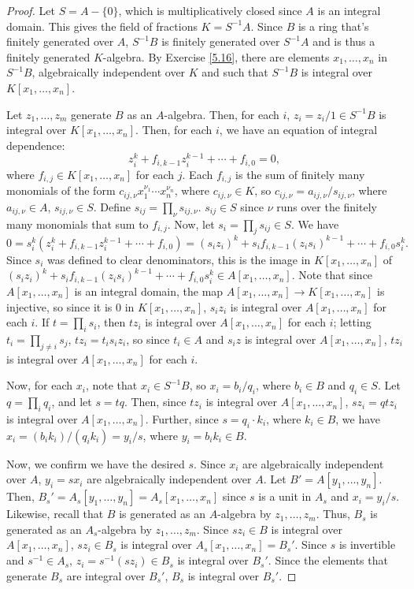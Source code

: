 \begin{proof}
Let $S = A - \{0\}$, which is multiplicatively closed since $A$ is an integral domain. This gives the field of fractions $K = S^{-1}A$. Since $B$ is a ring
that's finitely generated over $A$, $S^{-1}B$ is finitely generated over $S^{-1}A$ and is thus a finitely generated $K$-algebra. By Exercise \ref{5.16},
there are elements $x_1,\ldots,x_n$ in $S^{-1}B$, algebraically independent over $K$ and such that $S^{-1}B$ is integral over $K[x_1, \ldots, x_n]$.

Let $z_1,\ldots,z_m$ generate $B$ as an $A$-algebra. Then, for each $i$, $z_i = z_i/1 \in S^{-1}B$ is integral over $K[x_1,\ldots,x_n]$. Then, for each $i$,
we have an equation of integral dependence: 
$$z_i^k + f_{i,k-1} z_i^{k-1} + \cdots + f_{i,0} = 0,$$
where $f_{i,j} \in K[x_1,\ldots,x_n]$ for each $j$. Each $f_{i,j}$ is the sum of finitely many monomials of the form $c_{ij,\nu}x_1^{\nu_1}\cdots x_n^{\nu_n}$, 
where $c_{ij,\nu} \in K$, so $c_{ij,\nu} = a_{ij,\nu}/s_{ij,\nu}$, where $a_{ij,\nu} \in A$, $s_{ij,\nu} \in S$. Define $s_{ij} = \prod_{\nu}s_{ij,\nu}$. 
$s_{ij} \in S$ since $\nu$ runs over the finitely many monomials that sum to $f_{i,j}$. Now, let $s_i = \prod_j s_{ij} \in S$. We have
$$0 = s_i^k(z_i^k + f_{i,k-1} z_i^{k-1} + \cdots + f_{i,0}) = (s_i z_i)^k + s_i f_{i,k-1} (z_i s_i)^{k-1} + \cdots + f_{i,0}s_i^k.$$
Since $s_i$ was defined to clear denominators, this is the image in $K[x_1,\ldots,x_n]$ of $(s_i z_i)^k + s_i f_{i,k-1} (z_i s_i)^{k-1} + \cdots + f_{i,0}s_i^k \in A[x_1,\ldots,x_n]$.
Note that since $A[x_1,\ldots,x_n]$ is an integral domain, the map $A[x_1,\ldots,x_n] \to K[x_1,\ldots,x_n]$ is injective, so since it is $0$ in $K[x_1,\ldots,x_n]$, $s_i z_i$ is integral 
over $A[x_1,\ldots,x_n]$ for each $i$. If $t = \prod_i s_i$, then $t z_i$ is integral over $A[x_1,\ldots,x_n]$ for each $i$; letting $t_i = \prod_{j \neq i} s_j$, $t z_i = t_i s_i z_i$,
so since $t_i \in A$ and $s_i z$ is integral over $A[x_1,\ldots,x_n]$, $t z_i$ is integral over $A[x_1,\ldots,x_n]$ for each $i$.

Now, for each $x_i$, note that $x_i \in S^{-1}B$, so $x_i = b_i/q_i$, where $b_i \in B$ and $q_i \in S$. Let $q = \prod_i q_i$, and let $s = tq$. Then, since $tz_i$
is integral over $A[x_1,\ldots,x_n]$, $sz_i = qtz_i$ is integral over $A[x_1,\ldots,x_n]$. Further, since $s = q_i \cdot k_i$, where $k_i \in B$, we have
$x_i = (b_i k_i)/(q_i k_i) = y_i / s$, where $y_i = b_i k_i \in B$. 

Now, we confirm we have the desired $s$. Since $x_i$ are algebraically independent over $A$, $y_i = s x_i$ are algebraically independent over $A$. Let 
$B' = A[y_1,\ldots,y_n]$. Then, $B_s' = A_s[y_1,\ldots,y_n] = A_s[x_1,\ldots,x_n]$ since $s$ is a unit in $A_s$ and $x_i = y_i / s$. Likewise, recall that
$B$ is generated as an $A$-algebra by $z_1,\ldots,z_m$. Thus, $B_s$ is generated as an $A_s$-algebra by $z_1,\ldots,z_m$. Since $s z_i \in B$ is integral over 
$A[x_1,\ldots,x_n]$, $s z_i \in B_s$ is integral over $A_s[x_1,\ldots,x_n] = B_s'$. Since $s$ is invertible and $s^{-1} \in A_s$, $z_i = s^{-1} (s z_i) \in B_s$
is integral over $B_s'$. Since the elements that generate $B_s$ are integral over $B_s'$, $B_s$ is integral over $B_s'$.
\end{proof}

